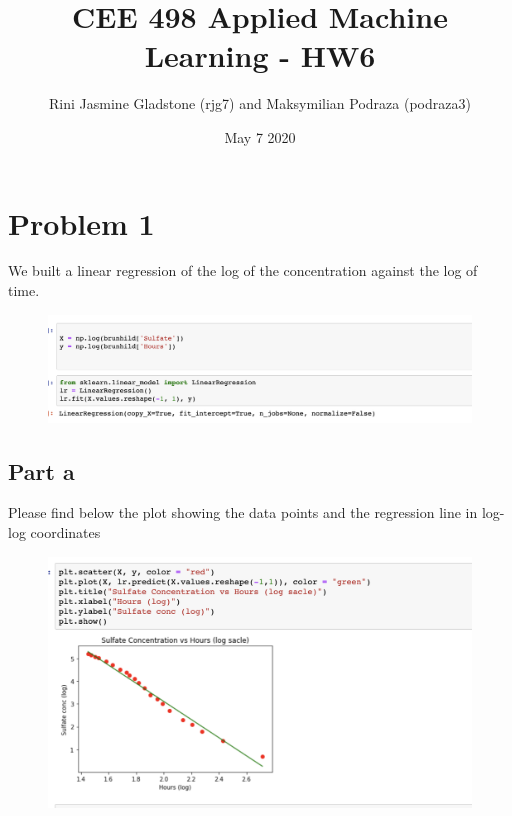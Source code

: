 \documentclass{article}      %
\title{CEE 498 Applied Machine Learning - HW6 }  %
\author{Rini Jasmine Gladstone (rjg7) and Maksymilian Podraza (podraza3)}      %
\date{May 7 2020}      %
\begin{document}

\maketitle                   %


\section{Problem 1}      %

We built  a linear regression of the log of the concentration against the log of time. 
\begin{figure}[H]
\centering
\includegraphics[width=\textwidth]{part1}
\end{figure}

\subsection{Part a} Please find below the plot showing the data points and the regression line in log-log coordinates

\begin{figure}[H]
\centering
\includegraphics[width=\textwidth]{part2}
\end{figure}
\end{document}
